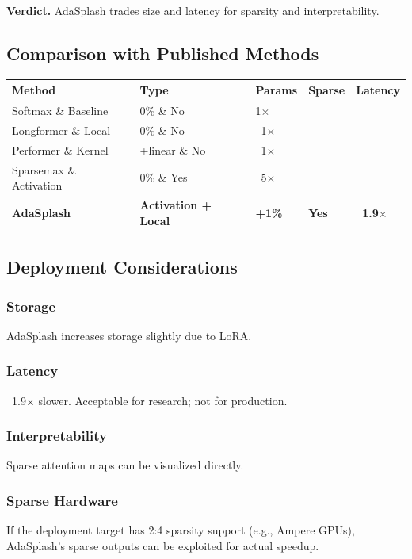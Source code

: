 \textbf{Verdict.} AdaSplash trades size and latency for sparsity and interpretability.

\subsection{Comparison with Published Methods}

\begin{table}[H]
\centering
\small
\begin{tabular}{lllll}
\toprule
\textbf{Method} & \textbf{Type} & \textbf{Params} & \textbf{Sparse} & \textbf{Latency} \\
\midrule
Softmax \& Baseline & 0\% \& No & 1$\times$ \\
Longformer \& Local & 0\% \& No & ~1$\times$ \\
Performer \& Kernel & +linear \& No & ~1$\times$ \\
Sparsemax \& Activation & 0\% \& Yes & ~5$\times$ \\
\textbf{AdaSplash} & \textbf{Activation + Local} & \textbf{+1\%} & \textbf{Yes} & \textbf{~1.9$\times$} \\
\bottomrule
\end{tabular}
\end{table}

\subsection{Deployment Considerations}

\subsubsection{Storage}
AdaSplash increases storage slightly due to LoRA.

\subsubsection{Latency}
~1.9$\times$ slower. Acceptable for research; not for production.

\subsubsection{Interpretability}
Sparse attention maps can be visualized directly.

\subsubsection{Sparse Hardware}
If the deployment target has 2:4 sparsity support (e.g., Ampere GPUs), 
AdaSplash's sparse outputs can be exploited for actual speedup.

